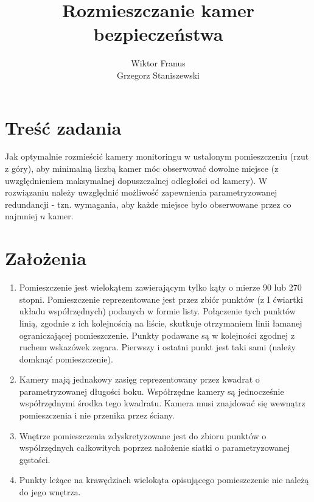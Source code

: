 \documentclass[12pt,a4paper]{article}
\title{Rozmieszczanie kamer bezpieczeństwa}
\author{Wiktor Franus \\ Grzegorz Staniszewski}
\begin{document}
\maketitle
\tableofcontents

\newpage
\section{Treść zadania}
Jak optymalnie rozmieścić kamery monitoringu w ustalonym pomieszczeniu (rzut z góry), aby minimalną liczbą kamer móc obserwować dowolne miejsce (z uwzględnieniem maksymalnej dopuszczalnej odległości od kamery). W rozwiązaniu należy uwzględnić możliwość zapewnienia parametryzowanej redundancji - tzn. wymagania, aby każde miejsce było obserwowane przez co najmniej $n$ kamer.

\section{Założenia}
\begin{enumerate}

\item Pomieszczenie jest wielokątem zawierającym tylko kąty o mierze 90 lub 270 stopni. 
Pomieszczenie reprezentowane jest przez zbiór punktów (z I ćwiartki układu współrzędnych) podanych w formie listy. 
Połączenie tych punktów linią, zgodnie z ich kolejnością na liście, skutkuje otrzymaniem linii łamanej ograniczającej pomieszczenie.
Punkty podawane są w kolejności zgodnej z ruchem wskazówek zegara.
Pierwszy i ostatni punkt jest taki sami (należy domknąć pomieszczenie).
\item Kamery mają jednakowy zasięg reprezentowany przez kwadrat o parametryzowanej długości boku. 
Współrzędne kamery są jednocześnie współrzędnymi środka tego kwadratu. 
Kamera musi znajdować się wewnątrz pomieszczenia i nie przenika przez ściany.
\item Wnętrze pomieszczenia zdyskretyzowane jest do zbioru punktów o współrzędnych całkowitych poprzez nałożenie siatki o parametryzowanej gęstości.
\item Punkty leżące na krawędziach wielokąta opisującego pomieszczenie nie należą do jego wnętrza.
\end{enumerate}
\end{document}
